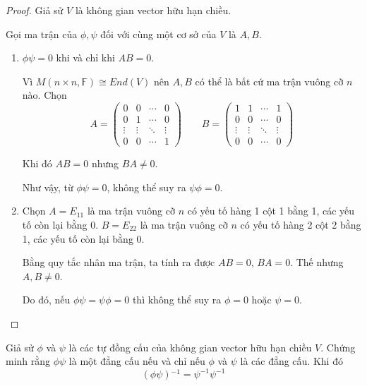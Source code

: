 \documentclass[class=nhvh-linear-algebra,crop=false]{standalone}
\begin{document}
\begin{proof}
    Giả sử $V$ là không gian vector hữu hạn chiều.
    \par Gọi ma trận của $\phi, \psi$ đối với cùng một cơ sở của $V$ là $A, B$.
    \begin{enumerate}[label = (\alph*)]
        \item $\phi\psi = 0$ khi và chỉ khi $AB = 0$.
              \par Vì $M(n\times n,\mathbb{F})\cong End(V)$ nên $A, B$ có thể là bất cứ ma trận vuông cỡ $n$ nào. Chọn
              \[
                  A =
                  \begin{pmatrix}
                      0      & 0      & \cdots & 0      \\
                      0      & 1      & \cdots & 0      \\
                      \vdots & \vdots & \ddots & \vdots \\
                      0      & 0      & \cdots & 1
                  \end{pmatrix}\qquad
                  B =
                  \begin{pmatrix}
                      1      & 1      & \cdots & 1      \\
                      0      & 0      & \cdots & 0      \\
                      \vdots & \vdots & \ddots & \vdots \\
                      0      & 0      & \cdots & 0
                  \end{pmatrix}
              \]
              \par Khi đó $AB = 0$ nhưng $BA\ne 0$.
              \par Như vậy, từ $\phi\psi = 0$, không thể suy ra $\psi\phi = 0$.
        \item Chọn $A = E_{11}$ là ma trận vuông cỡ $n$ có yếu tố hàng 1 cột 1 bằng 1, các yếu tố còn lại bằng 0. $B = E_{22}$ là ma trận vuông cỡ $n$ có yếu tố hàng 2 cột 2 bằng 1, các yếu tố còn lại bằng 0.
              \par Bằng quy tắc nhân ma trận, ta tính ra được $AB = 0$, $BA = 0$. Thế nhưng $A, B\ne 0$.
              \par Do đó, nếu $\phi\psi = \psi\phi = 0$ thì không thể suy ra $\phi = 0$ hoặc $\psi = 0$.
    \end{enumerate}
\end{proof}

\begin{exercise}
    Giả sử $\phi$ và $\psi$ là các tự đồng cấu của không gian vector hữu hạn chiều $V$. Chứng minh rằng $\phi\psi$ là một đẳng cấu nếu và chỉ nếu $\phi$ và $\psi$ là các đẳng cấu. Khi đó
    \[
        (\phi\psi){}^{-1} = \psi^{-1}\psi^{-1}
    \]
\end{exercise}
\end{document}

